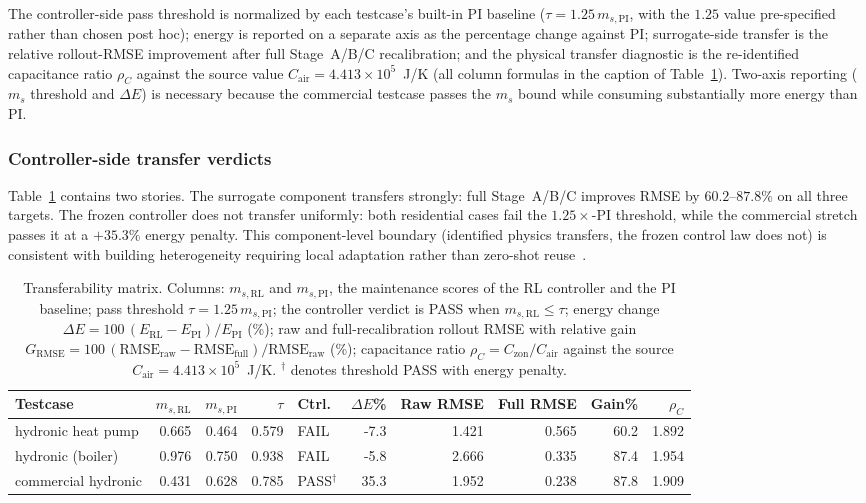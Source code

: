 The controller-side pass threshold is normalized by each testcase's built-in PI baseline ($\tau=1.25\,m_{s,\mathrm{PI}}$, with the $1.25$ value pre-specified rather than chosen post hoc); energy is reported on a separate axis as the percentage change against PI; surrogate-side transfer is the relative rollout-RMSE improvement after full Stage~A/B/C recalibration; and the physical transfer diagnostic is the re-identified capacitance ratio $\rho_C$ against the source value $C_{\mathrm{air}}=4.413\times10^5$~J/K (all column formulas in the caption of Table~\ref{tab:transfer_matrix}). Two-axis reporting ($m_s$ threshold and $\Delta E$) is necessary because the commercial testcase passes the $m_s$ bound while consuming substantially more energy than PI.

\subsubsection{Controller-side transfer verdicts}

Table~\ref{tab:transfer_matrix} contains two stories. The surrogate component transfers strongly: full Stage~A/B/C improves RMSE by $60.2$--$87.8\%$ on all three targets. The frozen controller does not transfer uniformly: both residential cases fail the $1.25\times$-PI threshold, while the commercial stretch passes it at a $+35.3\%$ energy penalty. This component-level boundary (identified physics transfers, the frozen control law does not) is consistent with building heterogeneity requiring local adaptation rather than zero-shot reuse~\citep{Coraci2024HeteroTL,Coraci2025HiLo}.

\begin{table}[pos={!ht}]
\centering
\scriptsize
\caption{Transferability matrix. Columns: $m_{s,\mathrm{RL}}$ and $m_{s,\mathrm{PI}}$, the maintenance scores of the RL controller and the PI baseline; pass threshold $\tau=1.25\,m_{s,\mathrm{PI}}$; the controller verdict is PASS when $m_{s,\mathrm{RL}}\le\tau$; energy change $\Delta E=100\,(E_{\mathrm{RL}}-E_{\mathrm{PI}})/E_{\mathrm{PI}}$ (\%); raw and full-recalibration rollout RMSE with relative gain $G_{\mathrm{RMSE}}=100\,(\mathrm{RMSE}_{\mathrm{raw}}-\mathrm{RMSE}_{\mathrm{full}})/\mathrm{RMSE}_{\mathrm{raw}}$ (\%); capacitance ratio $\rho_C=C_{\mathrm{zon}}/C_{\mathrm{air}}$ against the source $C_{\mathrm{air}}=4.413\times10^5$~J/K. $^\dagger$ denotes threshold PASS with energy penalty.}
\label{tab:transfer_matrix}
\begin{tabular}{lrrrlrrrrr}
\toprule
Testcase & $m_{s,\mathrm{RL}}$ & $m_{s,\mathrm{PI}}$ & $\tau$ & Ctrl. & $\Delta E$\% & Raw RMSE & Full RMSE & Gain\% & $\rho_C$ \\
\midrule
hydronic heat pump & 0.665 & 0.464 & 0.579 & FAIL & -7.3 & 1.421 & 0.565 & 60.2 & 1.892 \\
hydronic (boiler) & 0.976 & 0.750 & 0.938 & FAIL & -5.8 & 2.666 & 0.335 & 87.4 & 1.954 \\
commercial hydronic & 0.431 & 0.628 & 0.785 & PASS$^\dagger$ & 35.3 & 1.952 & 0.238 & 87.8 & 1.909 \\
\bottomrule
\end{tabular}
\end{table}



